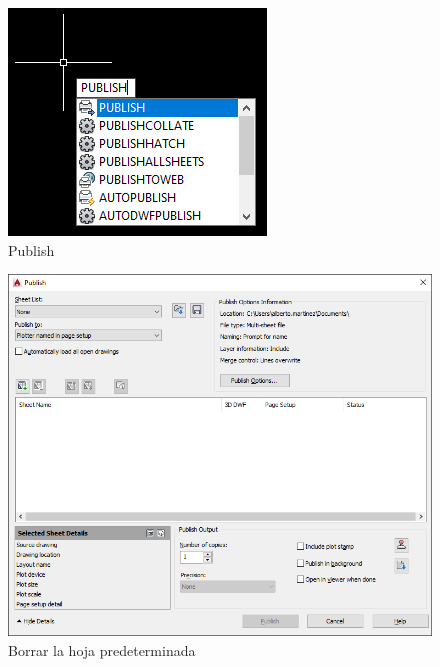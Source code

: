\documentclass[12pt,letterpaper,final]{report}
\begin{document}
\begin{figure}[H]
	\centering
	\includegraphics[width=0.75\linewidth, height=0.5\textheight,keepaspectratio]{Imagenes/autocad_publish_01}
	\caption{Publish}
	\label{fig:autocadpublish01}
\end{figure}

\begin{figure}[H]
	\centering
	\includegraphics[width=0.85\linewidth, height=0.5\textheight,keepaspectratio]{Imagenes/autocad_publish_02}
	\caption{Borrar la hoja predeterminada}
	\label{fig:autocadpublish02}
\end{figure}
\end{document}
